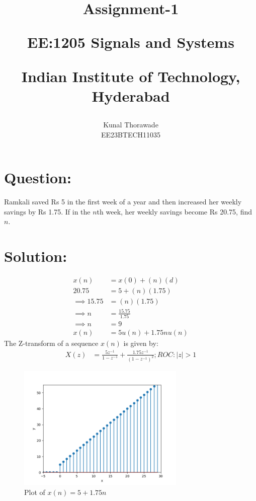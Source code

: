 \documentclass[journal,12pt,twocolumn]{IEEEtran}
\theoremstyle{remark}
\begin{document}
%




\vspace{3cm}

\title{
	Assignment-1 

	\large{EE:1205 Signals and Systems}

	Indian Institute of Technology, Hyderabad
}
\author{Kunal Thorawade

EE23BTECH11035
}	

\maketitle


\newpage


\bigskip
 
 \renewcommand{\thefigure}{\theenumi}
 \renewcommand{\thetable}{\theenumi}

 \section{\Large Question:}  Ramkali saved Rs 5 in the first week of a year and then increased her weekly savings by Rs 1.75. If in the $n$th week, her weekly savings become Rs 20.75, find $n$.

 \section{\Large Solution:} 
 

 \begin{align} 
	 x(n) &= x(0) + (n)(d)
	 \\ 20.75 &= 5 + (n)(1.75)  
	 \\ \implies 15.75 &= (n)(1.75)
	 \\ \implies n &= \frac{15.75}{1.75}
	 \\ \implies n &= 9
	 \\x(n) &= 5u(n) + 1.75nu(n)
 \end{align}
 The Z-transform of a sequence $x(n)$ is given by:
 \begin{align}
	  X(z) &= \frac{5z^{-1}}{1-z^{-1}}+\frac{1.75z^{-1}}{(1-z^{-1})^{2}} ; ROC : |z| > 1
 \end{align}

 \begin{figure}
	     \centering
	         \includegraphics[width = 8cm]{figs/fig1.png}
		     \caption{Plot of $x(n) = 5 + 1.75n$}
		         \label{fig:enter-label}
 \end{figure}
\end{document}
